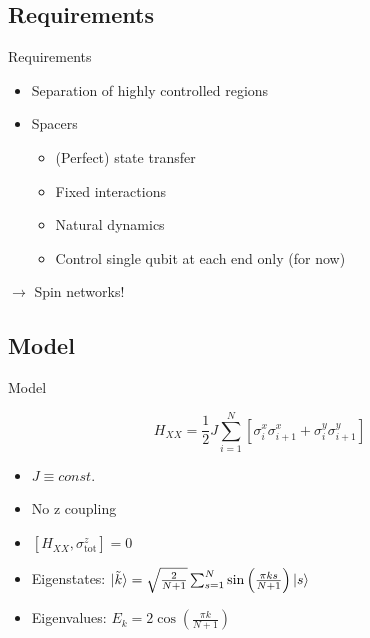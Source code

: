 \documentclass{beamer}
\begin{document}
\subsection{Requirements}
\begin{frame}{Requirements}
	\begin{itemize}
		\item Separation of highly controlled regions
		\item Spacers
		\begin{itemize}
			\item (Perfect) state transfer
			\item Fixed interactions
			\item Natural dynamics
			\item Control single qubit at each end only (for now)
		\end{itemize}
	\end{itemize}
	
	$\rightarrow$ Spin networks!
\end{frame}

\subsection{Model}
\begin{frame}[t]{Model}	
	\begin{exampleblock}{}
	\setlength\abovedisplayskip{-8pt}
	\begin{center}
		\[H_{XX}=\frac{1}{2}J\sum_{i=1}^{N}{\left[\sigma_i^x\sigma_{i+1}^x + \sigma_i^y\sigma_{i+1}^y\right]}\]
	\end{center}
	\end{exampleblock}
	\begin{itemize}
		\item $J\equiv const.$
		\item No z coupling
		\item $\left[H_{XX},\sigma^z_\text{tot}\right] = 0$
		\item Eigenstates: $\ket{\tilde{k}} = \sqrt{\frac{2}{N+1}}\sum_{s=1}^N\sin\left(\frac{\pi ks}{N+1}\right)\ket{s}$
		\item Eigenvalues: $ E_k = 2\cos\left(\frac{\pi k}{N+1}\right)$
	\end{itemize}
\end{frame}
\end{document}

